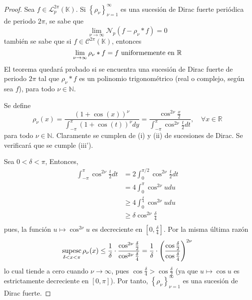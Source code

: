 \documentclass[12pt]{report}
\theoremstyle{largebreak}
\newcommand{\N}[2]{\ensuremath{\mathcal{N}_{#1}\left(#2\right)}}
\newcommand{\supesc}[1]{\ensuremath{\mathop{\textup{supesc}}_{#1}}}
\begin{document}
    \begin{proof}
        Sea $f\in\mathcal{L}_p^{2\pi}(\mathbb{K})$. Si $\left\{\rho_\nu \right\}_{\nu=1}^\infty$ es una sucesión de Dirac fuerte periódica de periodo $2\pi$, se sabe que
        \begin{equation*}
            \lim_{\nu\rightarrow\infty}\N{p}{f-\rho_\nu*f}=0
        \end{equation*}
        también se sabe que si $f\in\mathcal{C}^{2\pi}(\mathbb{K})$, entonces
        \begin{equation*}
            \lim_{\nu\rightarrow\infty}\rho_\nu*f=f\textup{ uniformemente en }\mathbb{R}
        \end{equation*}
        El teorema quedará probado si se encuentra una sucesión de Dirac fuerte de periodo $2\pi$ tal que $\rho_\nu*f$ es un polinomio trigonométrico (real o complejo, según sea $f$), para todo $\nu\in\mathbb{N}$.

        Se define
        \begin{equation*}
            \rho_\nu(x)=\frac{(1+\cos(x))^\nu}{\int_{-\pi}^\pi(1+\cos(t))^\nu dy}=\frac{\cos^{2\nu}\frac{x}{2}}{\int_{-\pi}^\pi\cos^{2\nu}\frac{t}{2}dt},\quad\forall x\in\mathbb{R}
        \end{equation*}
        para todo $\nu\in\mathbb{N}$. Claramente se cumplen de (i) y (ii) de sucesiones de Dirac. Se verificará que se cumple (iii').

        Sea $0<\delta<\pi$, Entonces,
        \begin{equation*}
            \begin{split}
                \int_{-\pi}^{\pi}\cos^{2\nu}\frac{t}{2}dt&=2\int_0^{\pi/2} \cos^{2\nu}\frac{t}{2}dt\\
                &=4\int_0^\pi\cos^{2\nu}udu\\
                &\geq 4\int_0^{\frac{\delta}{4}}\cos^{2\nu}udu\\
                &\geq\delta\cos^{2\nu}\frac{\delta}{4}\\
            \end{split}
        \end{equation*}
        pues, la función $u\mapsto\cos^{2\nu}u$ es decreciente en $\left[0,\frac{\delta}{4}\right]$. Por la misma última razón
        \begin{equation*}
            \begin{split}
                \supesc{\delta<x<\pi}\rho_\nu(x)\leq\frac{1}{\delta}\cdot\frac{\cos^{2\nu}\frac{\delta}{2}}{\cos^{2\nu}\frac{\delta}{4}}=\frac{1}{\delta}\cdot\left(\frac{\cos\frac{\delta}{2}}{\cos\frac{\delta}{4}}\right)^{2\nu}
            \end{split}
        \end{equation*}
        lo cual tiende a cero cuando $\nu\rightarrow\infty$, pues $\cos\frac{\delta}{4}>\cos\frac{\delta}{2}$ (ya que $u\mapsto \cos u$ es estrictamente decreciente en $[0,\pi]$). Por tanto, $\left\{\rho_\nu \right\}_{\nu=1}^\infty$ es una sucesión de Dirac fuerte.


\end{proof}
\end{document}
